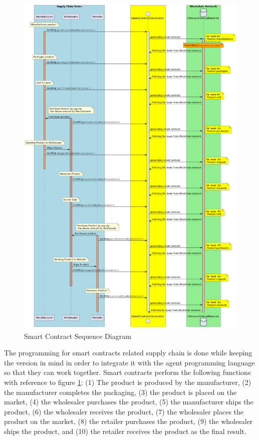 \vspace{.5cm}

    \begin{figure}[h!]
    \centering
      \includegraphics[width=12cm]{includes/figures/Sequence Diagram.png} 
      \caption{Smart Contract Sequence Diagram}
      \label{Smart Contract Sequence Diagram}
    \end{figure}

The programming for smart contracts related supply chain is done while keeping the version in mind in order to integrate it with the agent programming language so that they can work together. Smart contracts perform the following functions with reference to figure \ref{Smart Contract Sequence Diagram}: (1) The product is produced by the manufacturer, (2) the manufacturer completes the packaging, (3) the product is placed on the market, (4) the wholesaler purchases the product, (5) the manufacturer ships the product, (6) the wholesaler receives the product, (7) the wholesaler places the product on the market, (8) the retailer purchases the product, (9) the wholesaler ships the product, and (10) the retailer receives the product as the final result.


